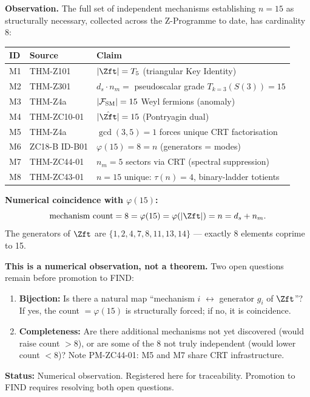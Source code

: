\documentclass[12pt, a4paper]{article}
\providecommand{\nm}{n_m}
\providecommand{\ds}{d_s}
\providecommand{\phitot}{\varphi}
\begin{document}
\begin{derivedbox}[title={OBS-ZC44-01: Mechanism Count
  $= \phitot(15) = n = 8$ (Numerical Observation)}]
\label{sec:obs-zc44-01}

\textbf{Observation.}
The full set of independent mechanisms establishing
$n = 15$ as structurally necessary, collected across
the Z-Programme to date, has cardinality 8:

\medskip
{\small
\renewcommand{\arraystretch}{1.35}
\begin{center}
\begin{tabular}{p{0.6cm}p{3.0cm}p{7.5cm}}
\toprule
\textbf{ID} & \textbf{Source} & \textbf{Claim} \\
\midrule
M1 & THM-Z101   & $|{\Zft}| = T_5$ (triangular Key Identity) \\
M2 & THM-Z301   & $\ds\cdot\nm = $ pseudoscalar grade $T_{k=3}(S(3)) = 15$ \\
M3 & THM-Z4a    & $|\mathcal{F}_{\rm SM}| = 15$ Weyl fermions (anomaly) \\
M4 & THM-ZC10-01 & $|\hat{\Zft}| = 15$ (Pontryagin dual) \\
M5 & THM-Z4a    & $\gcd(3,5)=1$ forces unique CRT factorisation \\
M6 & ZC18-B ID-B01 & $\phitot(15) = 8 = n$ (generators = modes) \\
M7 & THM-ZC44-01 & $\nm = 5$ sectors via CRT (spectral suppression) \\
M8 & THM-ZC43-01 & $n=15$ unique: $\tau(n)=4$, binary-ladder totients \\
\bottomrule
\end{tabular}
\end{center}
}

\medskip
\textbf{Numerical coincidence with $\phitot(15)$:}
\[
  \text{mechanism count} = 8
  = \phitot(15) = \phitot(|\Zft|) = n
  = \ds + \nm.
\]
The generators of $\Zft$ are
$\{1, 2, 4, 7, 8, 11, 13, 14\}$ --- exactly 8 elements
coprime to 15.

\textbf{This is a numerical observation, not a theorem.}
Two open questions remain before promotion to FIND:
\begin{enumerate}[leftmargin=*, noitemsep, itemsep=2pt]
\item \textbf{Bijection:} Is there a natural map
  ``mechanism $i$ $\leftrightarrow$ generator $g_i$ of
  $\Zft$''? If yes, the count $= \phitot(15)$ is
  structurally forced; if no, it is coincidence.
\item \textbf{Completeness:} Are there additional mechanisms
  not yet discovered (would raise count $> 8$), or are some
  of the 8 not truly independent (would lower count $< 8$)?
  Note PM-ZC44-01: M5 and M7 share CRT infrastructure.
\end{enumerate}

\textbf{Status:} Numerical observation.
Registered here for traceability.
Promotion to FIND requires resolving both open questions.
\end{derivedbox}
\end{document}
